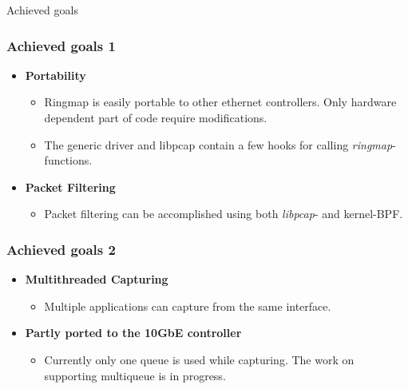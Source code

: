 \begin{frame}
	\begin{center}
	\huge{Achieved goals}
	\end{center}
\end{frame}


\begin{frame}
\frametitle{Achieved goals 1}
\begin{itemize}
	\item \textbf{Portability}
		\begin{itemize}
			\item Ringmap is easily portable to other ethernet controllers.
				Only hardware dependent part of code require modifications.
			\item The generic driver and libpcap contain a few hooks for calling
				\emph{ringmap}-functions.\newline
		\end{itemize}
	\item \textbf{Packet Filtering}
		\begin{itemize}
			\item Packet filtering can be accomplished using both
				\emph{libpcap}- and kernel-BPF.
		\end{itemize}
\end{itemize}
\end{frame}


\begin{frame}
\frametitle{Achieved goals 2}
\begin{itemize}
	\item \textbf{Multithreaded Capturing}
		\begin{itemize}
			\item Multiple applications can capture from the same interface. \newline
		\end{itemize}
	\item \textbf{Partly ported to the 10GbE controller}
		\begin{itemize}
			\item Currently only one queue is used while capturing. The work on
				supporting multiqueue is in progress.
		\end{itemize}
\end{itemize}
\end{frame}


